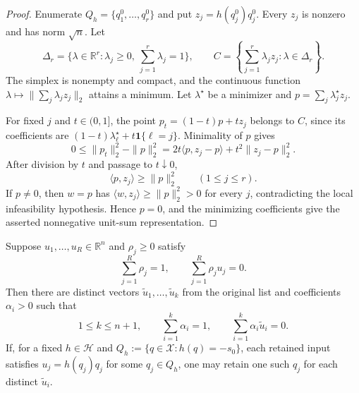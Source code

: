 \begin{proof}
Enumerate $Q_h=\{q_1^0,\ldots,q_r^0\}$ and put
$z_j=h(q_j^0)q_j^0$.  Every $z_j$ is nonzero and has norm $\sqrt n$.  Let
\[
 \Delta_r=\{\lambda\in\mathbb R^r:\lambda_j\geq0,
 \ \sum_{j=1}^r\lambda_j=1\},
 \qquad
 C=\left\{\sum_{j=1}^r\lambda_jz_j:\lambda\in\Delta_r\right\}.
\]
The simplex is nonempty and compact, and the continuous function
$\lambda\mapsto\|\sum_j\lambda_jz_j\|_2$ attains a minimum.  Let
$\lambda^\star$ be a minimizer and
$p=\sum_j\lambda_j^\star z_j$.

For fixed $j$ and $t\in(0,1]$, the point
$p_t=(1-t)p+t z_j$ belongs to $C$, since its coefficients are
$(1-t)\lambda_\ell^\star+t\mathbf 1\{\ell=j\}$.  Minimality of $p$ gives
\[
0\leq\|p_t\|_2^2-\|p\|_2^2
=2t\langle p,z_j-p\rangle+t^2\|z_j-p\|_2^2.
\]
After division by $t$ and passage to $t\downarrow0$,
\[
\langle p,z_j\rangle\geq\|p\|_2^2
\qquad(1\leq j\leq r).
\]
If $p\neq0$, then $w=p$ has
$\langle w,z_j\rangle\geq\|p\|_2^2>0$ for every $j$, contradicting the
local infeasibility hypothesis.  Hence $p=0$, and the minimizing coefficients
give the asserted nonnegative unit-sum representation.
\end{proof}

\begin{lemma}
\label{lem:step-005-support-pruning}
Suppose $u_1,\ldots,u_R\in\mathbb R^n$ and $\rho_j\geq0$ satisfy
\[
\sum_{j=1}^R\rho_j=1,
\qquad
\sum_{j=1}^R\rho_j u_j=0.
\]
Then there are distinct vectors $\widetilde u_1,\ldots,\widetilde u_k$
from the original list and coefficients $\alpha_i>0$ such that
\[
1\leq k\leq n+1,
\qquad \sum_{i=1}^k\alpha_i=1,
\qquad \sum_{i=1}^k\alpha_i\widetilde u_i=0.
\]
If, for a fixed $h\in\mathcal H$ and
$Q_h:=\{q\in\mathcal X:h(q)=-s_0\}$, each retained input satisfies
$u_j=h(q_j)q_j$ for some $q_j\in Q_h$, one may retain one such $q_j$ for
each distinct $\widetilde u_i$.
\end{lemma}

